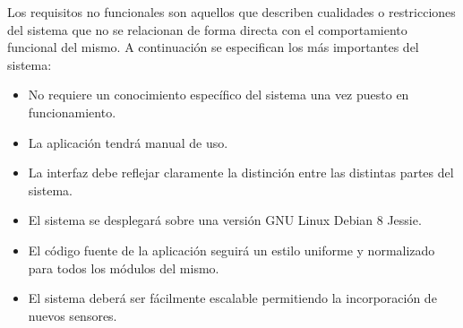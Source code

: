 Los requisitos no funcionales son aquellos que describen cualidades o restricciones del sistema que no se relacionan de forma directa con el comportamiento funcional del mismo. 
A continuación se especifican los más importantes del sistema:
\begin{itemize}
\item No requiere un conocimiento específico del sistema una vez puesto en funcionamiento.
\item La aplicación tendrá manual de uso.
\item La interfaz debe reflejar claramente la distinción entre las distintas partes del sistema.
\item El sistema se desplegará sobre una versión GNU Linux Debian 8 Jessie.
\item El código fuente de la aplicación seguirá un estilo uniforme y normalizado para todos los módulos del mismo.
\item El sistema deberá ser fácilmente escalable permitiendo la incorporación de nuevos sensores.
\end{itemize}
